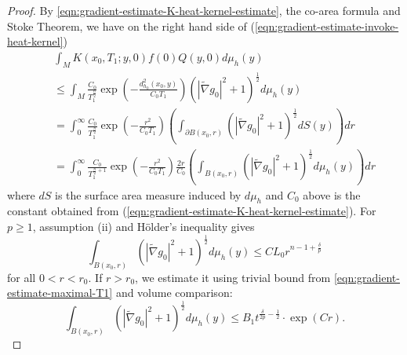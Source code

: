 \documentclass[12pt]{amsart}
\theoremstyle{plain}
\theoremstyle{plain}
\theoremstyle{definition}
\theoremstyle{remark}
\numberwithin{equation}{subsection}
\newcommand{\hdel}{\tilde{\nabla}}
\begin{document}
\begin{proof}
    By \eqref{eqn:gradient-estimate-K-heat-kernel-estimate}, the co-area formula and Stoke Theorem, we have on the right hand side of (\ref{eqn:gradient-estimate-invoke-heat-kernel})
    \begin{align}\label{eqn:gradient-estimate-Q-heat-kernel-estimate2}
        &\int_{M} K(x_0, T_1; y, 0)f(0)Q(y,0)d\mu_h(y) \nonumber \\
        \quad& \leq \int_{M} \frac{C_0}{T_1^{\frac{n}{2}}}\exp\left(-\frac{d^2_{h_0}(x_0, y)}{C_0 T_1}\right)\left(|\hdel g_0|^2 +1\right)^{\frac{1}{2}}d\mu_h(y) \nonumber \\
        &= \int_0^{\infty} \frac{C_0}{T_1^{\frac{n}{2}}}\exp\left(-\frac{r^2}{C_0 T_1}\right)\left(\int_{\partial B(x_0, r)}\left(|\hdel g_0|^2 + 1\right)^{\frac{1}{2}}dS(y)\right)dr \nonumber \\
        &= \int_0^{\infty} \frac{C_0}{T_1^{\frac{n}{2}+1}}\exp\left(-\frac{r^2}{C_0 T_1}\right)\frac{2r}{C_0}\left(\int_{B(x_0, r)}\left(|\hdel g_0|^2 + 1\right)^{\frac{1}{2}}d\mu_h(y)\right)dr
    \end{align}
    where $dS$ is the surface area measure induced by $d\mu_h$ and $C_0$ above is the constant obtained from (\ref{eqn:gradient-estimate-K-heat-kernel-estimate}). For $p \geq 1$, assumption (ii) and H\"older's inequality gives
    \begin{equation*}
        \int_{B(x_0, r)} \left(|\hdel g_0|^2 + 1\right)^{\frac{1}{2}}d\mu_h(y) \leq CL_0r^{n-1+\frac{\delta}{p}}
    \end{equation*}
    for all $0<r<r_0$. If $r>r_0$, we estimate it using trivial bound from \eqref{eqn:gradient-estimate-maximal-T1} and volume comparison:
     \begin{equation*}
        \int_{B(x_0, r)} \left(|\hdel g_0|^2 + 1\right)^{\frac{1}{2}}d\mu_h(y) \leq  B_1t^{\frac\delta{2p}-\frac12}\cdot \exp\left(Cr\right).
    \end{equation*}
    

\end{proof}
\end{document}
